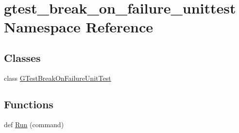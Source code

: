 \hypertarget{namespacegtest__break__on__failure__unittest}{}\section{gtest\+\_\+break\+\_\+on\+\_\+failure\+\_\+unittest Namespace Reference}
\label{namespacegtest__break__on__failure__unittest}
\subsection*{Classes}
\begin{DoxyCompactItemize}
\item 
class \hyperlink{classgtest__break__on__failure__unittest_1_1_g_test_break_on_failure_unit_test}{G\+Test\+Break\+On\+Failure\+Unit\+Test}
\end{DoxyCompactItemize}
\subsection*{Functions}
\begin{DoxyCompactItemize}
\item 
def \hyperlink{namespacegtest__break__on__failure__unittest_a0dd80fec2d9cbd9b6fa70130f7b228ec}{Run} (command)
\end{DoxyCompactItemize}
